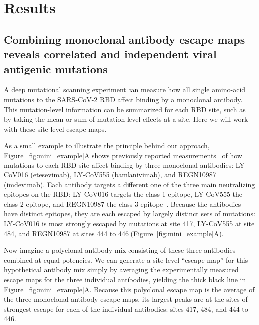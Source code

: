 \documentclass[9pt,twocolumn,twoside]{gsajnl_modified}
\begin{document}
\section{Results}

\subsection{Combining monoclonal antibody escape maps reveals correlated and independent viral antigenic mutations}
A deep mutational scanning experiment can measure how all single amino-acid mutations to the SARS-CoV-2 RBD affect binding by a monoclonal antibody.
This mutation-level information can be summarized for each RBD site, such as by taking the mean or sum of mutation-level effects at a site.
Here we will work with these site-level escape maps.

As a small example to illustrate the principle behind our approach, Figure~\ref{fig:mini_example}A shows previously reported measurements~\citep{starr2021prospective, starr2021complete} of how mutations to each RBD site affect binding by three monoclonal antibodies: LY-CoV016 (etesevimab), LY-CoV555 (bamlanivimab), and REGN10987 (imdevimab).
Each antibody targets a different one of the three main neutralizing epitopes on the RBD: LY-CoV016 targets the class 1 epitope, LY-CoV555 the class 2 epitope, and REGN10987 the class 3 epitope~\citep{barnes2020sars,greaney2021mapping}.
Because the antibodies have distinct epitopes, they are each escaped by largely distinct sets of mutations: LY-CoV016 is most strongly escaped by mutations at site 417, LY-CoV555 at site 484, and REGN10987 at sites 444 to 446 (Figure~\ref{fig:mini_example}A).

Now imagine a polyclonal antibody mix consisting of these three antibodies combined at equal potencies.
We can generate a site-level ``escape map'' for this hypothetical antibody mix simply by averaging the experimentally measured escape maps for the three individual antibodies, yielding the thick black line in Figure~\ref{fig:mini_example}A.
Because this polyclonal escape map is the average of the three monoclonal antibody escape maps, its largest peaks are at the sites of strongest escape for each of the individual antibodies: sites 417, 484, and 444 to 446.
\end{document}

